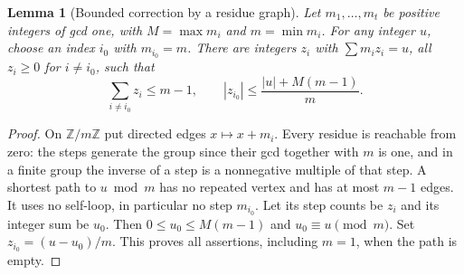 \documentclass[11pt]{article}
\newtheorem{lemma}[theorem]{Lemma}
\theoremstyle{definition}
\theoremstyle{remark}
\newcommand{\Z}{\mathbb Z}
\begin{document}
\begin{lemma}[Bounded correction by a residue graph]\label{lem:correction}
Let $m_1,\ldots,m_t$ be positive integers of gcd one, with $M=\max m_i$ and $m=\min m_i$. For any integer $u$, choose an index $i_0$ with $m_{i_0}=m$. There are integers $z_i$ with $\sum m_i z_i=u$, all $z_i\ge0$ for $i\ne i_0$, such that
\[
 \sum_{i\ne i_0}z_i\le m-1,
 \qquad
 |z_{i_0}|\le\frac{|u|+M(m-1)}{m}.
\]
\end{lemma}
\begin{proof}
On $\Z/m\Z$ put directed edges $x\mapsto x+m_i$. Every residue is reachable from zero: the steps generate the group since their gcd together with $m$ is one, and in a finite group the inverse of a step is a nonnegative multiple of that step. A shortest path to $u\bmod m$ has no repeated vertex and has at most $m-1$ edges. It uses no self-loop, in particular no step $m_{i_0}$. Let its step counts be $z_i$ and its integer sum be $u_0$. Then $0\le u_0\le M(m-1)$ and $u_0\equiv u\pmod m$. Set $z_{i_0}=(u-u_0)/m$. This proves all assertions, including $m=1$, when the path is empty.
\end{proof}
\end{document}
